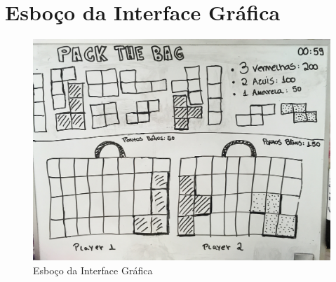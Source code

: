 \documentclass[
	12pt,	
	openany,			
	oneside,			
	a4paper,			
	english,			
	french,			
	spanish,			
	brazil,	
	]{abntex2}
\begin{document}
\chapter{Esboço da Interface Gráfica}
\begin{figure}[H]
  \includegraphics[width=\linewidth]{File_000.jpeg}
  \caption{Esboço da Interface Gráfica}
  \centering
  \label{fig:esboco}
\end{figure}


 
\end{document}
